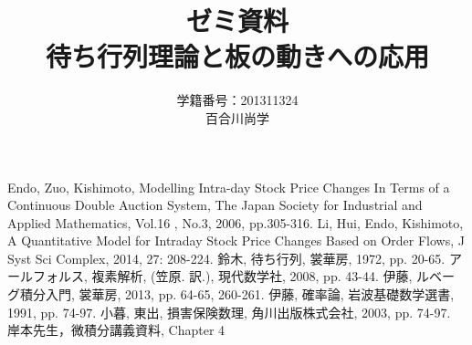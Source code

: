 \documentclass[a4j,papersize,disablejfam,slide,14pt]{jsarticle}
\begin{document}
\title{\Huge ゼミ資料\\待ち行列理論と板の動きへの応用}
\author{\Large 学籍番号：201311324\\百合川尚学}
\maketitle

\tableofcontents

\begin{thebibliography}{9}
         {\rm Endo, Zuo, Kishimoto, 
        Modelling Intra-day Stock Price Changes In Terms of
        a Continuous Double Auction System, 
        The Japan Society for Industrial and Applied Mathematics, 
        Vol.16 , No.3, 2006, pp.305-316.}
         {\rm Li, Hui, Endo, Kishimoto, A Quantitative Model for Intraday Stock Price
         Changes Based on Order Flows, 
         J Syst Sci Complex, 2014, 27: 208-224.}
         {\rm 鈴木, 待ち行列, 裳華房, 1972, pp. 20-65.}
         {\rm アールフォルス, 複素解析, (笠原. 訳.), 現代数学社, 2008, pp. 43-44.}
         {\rm 伊藤, ルベーグ積分入門, 裳華房, 2013, pp. 64-65, 260-261.}
         {\rm 伊藤, 確率論, 岩波基礎数学選書, 1991, pp. 74-97.}
         {\rm 小暮, 東出, 損害保険数理, 角川出版株式会社, 2003, pp. 74-97.}
         {\rm 岸本先生，微積分講義資料, Chapter 4}
\end{thebibliography}
\end{document}

